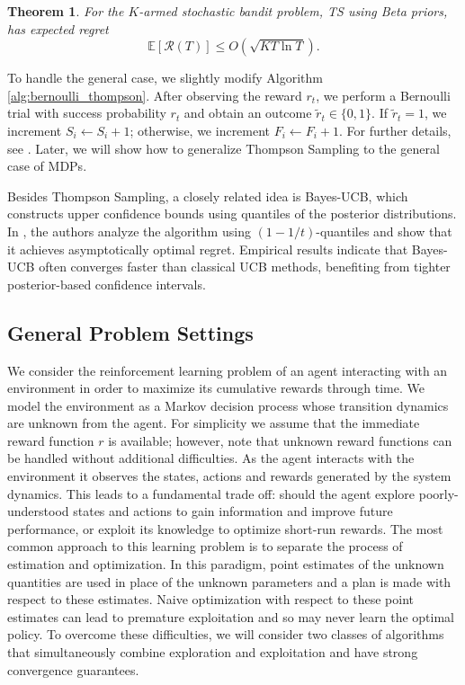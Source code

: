 \documentclass{article}
\numberwithin{equation}{section}
\newtheorem{theorem}{Theorem}
\begin{document}
\begin{theorem}
    For the \(K\)-armed stochastic bandit problem, TS using Beta priors, has expected regret
    \[\mathbb{E}[\mathcal{R}(T)]\leq O(\sqrt{KT\ln T}).\]
\end{theorem}
To handle the general case, we slightly modify Algorithm \ref{alg:bernoulli_thompson}. After observing the reward \(r_t\), we perform a Bernoulli trial with success probability \(r_t\) and obtain an outcome \(\tilde{r}_t \in \{0, 1\}\). If \(\tilde{r}_t = 1\), we increment \(S_i \leftarrow S_i + 1\); otherwise, we increment \(F_i \leftarrow F_i + 1\). For further details, see \cite{agrawal2012analysis}. Later, we will show how to generalize Thompson Sampling to the general case of MDPs.

Besides Thompson Sampling, a closely related idea is Bayes-UCB, which constructs upper confidence bounds using quantiles of the posterior distributions. In \cite{kaufmann2012bayesian}, the authors analyze the algorithm using $(1 - 1/t)$-quantiles and show that it achieves asymptotically optimal regret. Empirical results indicate that Bayes-UCB often converges faster than classical UCB methods, benefiting from tighter posterior-based confidence intervals.
\subsection{General Problem Settings}

We consider the reinforcement learning problem of an agent interacting with an environment in order to maximize
its cumulative rewards through time. We model the environment
as a Markov decision process whose transition dynamics are unknown from the agent. For simplicity we assume that the immediate reward function $r$ is available; however, note that unknown reward functions can be handled without additional difficulties. As the agent interacts with the environment it observes the states, actions and rewards generated by the system dynamics. This leads to a
fundamental trade off: should the agent explore poorly-understood states and actions to gain information and improve
future performance, or exploit its knowledge to optimize short-run rewards. The most common approach to this learning problem is to separate the process of estimation and optimization. In
this paradigm, point estimates of the unknown quantities are used in place of the unknown parameters and a plan is
made with respect to these estimates. Naive optimization with respect to these point estimates can lead to premature
exploitation and so may never learn the optimal policy. To overcome these difficulties, we will consider two classes of algorithms that simultaneously combine exploration and exploitation and have strong convergence guarantees.
\end{document}
